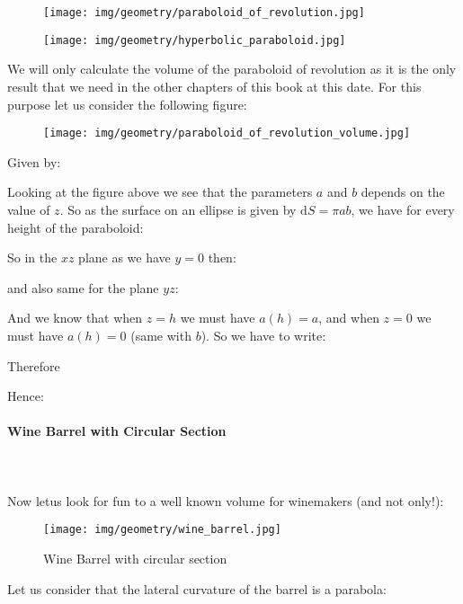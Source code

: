 {	\begin{figure}[H]
		\centering
		\begin{minipage}{.45\linewidth}
		  \texttt{[image: img/geometry/paraboloid\_of\_revolution.jpg]}
		  \label{img1}
		\end{minipage}
		\hspace{.05\linewidth}
		\begin{minipage}{.45\linewidth}
		  \texttt{[image: img/geometry/hyperbolic\_paraboloid.jpg]}
		  \label{img2}
		\end{minipage}
	\end{figure}
	We will only calculate the volume of the paraboloid of revolution as it is the only result that we need in the other chapters of this book at this date. For this purpose let us consider the following figure:
	\begin{figure}[H]
		\centering
		\texttt{[image: img/geometry/paraboloid\_of\_revolution\_volume.jpg]}
	\end{figure}
	Given by:
	
	Looking at the figure above we see that the parameters $a$ and $b$ depends  on the value of $z$. So as the surface on an ellipse is given by $\mathrm{d}S=\pi a b$, we have for every height of the paraboloid:
	
	So in the $xz$ plane as we have $y=0$ then:
	
	and also same for the plane $yz$:
	
	And we know that when $z=h$ we must have $a(h)=a$, and when $z=0$ we must have $a(h)=0$ (same with $b$). So we have to write:
	
	Therefore
	
	Hence:
	
	
	\paragraph{Wine Barrel with Circular Section}\mbox{}\\\\
	Now letus look for fun to a well known volume for winemakers (and not only!):
	\begin{figure}[H]
		\centering
		\texttt{[image: img/geometry/wine\_barrel.jpg]}
		\caption[]{Wine Barrel with circular section}
	\end{figure}
	Let us consider that the lateral curvature of the barrel is a parabola:
	
}
